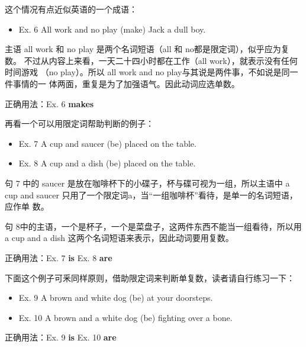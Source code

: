 这个情况有点近似英语的一个成语：
\begin{mybox}
  \begin{itemize}
  \item   Ex. 6 All work and no play (make) Jack a dull boy.
  \end{itemize}
  主语 all work 和 no play 是两个名词短语（all 和 no都是限定词），似乎应为复数。
  不过从内容上来看，一天二十四小时都在工作（all work），就表示没有任何时间游戏
  （no play）。所以 all work and no play与其说是两件事，不如说是同一件事情的一
  体两面，重复是为了加强语气。因此动词应选单数。

  \tcblower
  正确用法：Ex. 6 \textbf{makes}
\end{mybox}

再看一个可以用限定词帮助判断的例子：
\begin{mybox}
  \begin{itemize}
  \item   Ex. 7 A cup and saucer (be) placed on the table.
  \item   Ex. 8 A cup and a dish (be) placed on the table.
  \end{itemize}
  句 7 中的 saucer 是放在咖啡杯下的小碟子，杯与碟可视为一组，所以主语中 a cup
  and saucer 只用了一个限定词a，当“一组咖啡杯”看待，是单一的名词短语，应作单
  数。

  句 8中的主语，一个是杯子，一个是菜盘子，这两件东西不能当一组看待，所以用 a
  cup and a dish 这两个名词短语来表示，因此动词要用复数。

  \tcblower
  正确用法：Ex. 7 \textbf{is} \qquad\quad Ex. 8 \textbf{are}
\end{mybox}

下面这个例子可釆同样原则，借助限定词来判断单复数，读者请自行练习一下：
\begin{mybox}
  \begin{itemize}
  \item   Ex. 9 A brown and white dog (be) at your doorsteps.
  \item   Ex. 10 A brown and a white dog (be) fighting over a bone.
  \end{itemize}
  \tcblower
  正确用法：Ex. 9 \textbf{is} \qquad\quad Ex. 10 \textbf{are}
\end{mybox}

